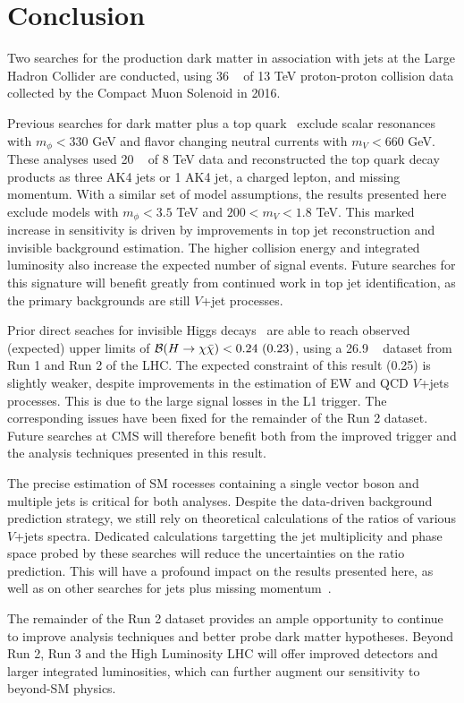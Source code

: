 \chapter{Conclusion}

Two searches for the production dark matter in association with jets at the Large Hadron Collider are conducted, using 36 \fbinv~ of 13 TeV proton-proton collision data collected by the Compact Muon Solenoid in 2016.

Previous searches for dark matter plus a top quark~\cite{cms8mt,atlas8mt} exclude scalar resonances with $m_\phi<330$ GeV and flavor changing neutral currents with $m_V<660$ GeV.
These analyses used 20 \fbinv~ of 8 TeV data and reconstructed the top quark decay products as three AK4 jets or 1 AK4 jet, a charged lepton, and missing momentum.
With a similar set of model assumptions, the results presented here exclude models with $m_\phi < 3.5$ TeV and $200<m_V<1.8$ TeV.
This marked increase in sensitivity is driven by improvements in top jet reconstruction and invisible background estimation.
The higher collision energy and integrated luminosity also increase the expected number of signal events. 
Future searches for this signature will benefit greatly from continued work in top jet identification, as the primary backgrounds are still $V$+jet processes.

Prior direct seaches for invisible Higgs decays~\cite{cmshinvrun1} are able to reach observed (expected) upper limits of $\mathcal{B}(H\rightarrow\chi\bar\chi) < 0.24~(0.23)$, using a 26.9 \fbinv~ dataset from Run 1 and Run 2 of the LHC.
The expected constraint of this result (0.25) is slightly weaker, despite improvements in the estimation of EW and QCD $V$+jets processes.
This is due to the large signal losses in the L1 trigger.
The corresponding issues have been fixed for the remainder of the Run 2 dataset.
Future searches at CMS will therefore benefit both from the improved trigger and the analysis techniques presented in this result.

The precise estimation of SM rocesses containing a single vector boson and multiple jets is critical for both analyses.
Despite the data-driven background prediction strategy, we still rely on theoretical calculations of the ratios of various $V$+jets spectra.
Dedicated calculations targetting the jet multiplicity and phase space probed by these searches will reduce the uncertainties on the ratio prediction.
This will have a profound impact on the results presented here, as well as on other searches for jets plus missing momentum~\cite{monojet,monohiggs,ttdm}.

The remainder of the Run 2 dataset provides an ample opportunity to continue to improve analysis techniques and better probe dark matter hypotheses.
Beyond Run 2, Run 3 and the High Luminosity LHC will offer improved detectors and larger integrated luminosities, which can further augment our sensitivity to beyond-SM physics.
